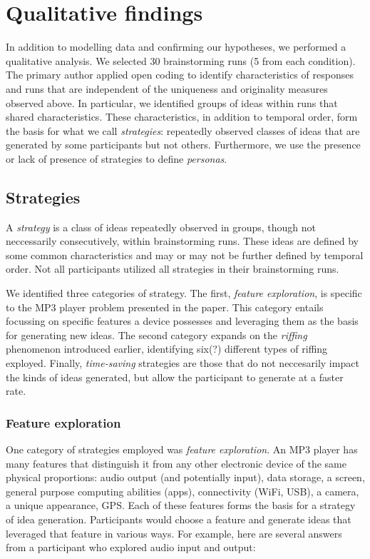 \section{Qualitative findings}

In addition to modelling data and confirming our hypotheses, we performed a qualitative analysis.
We selected 30 brainstorming runs (5 from each condition). The primary author applied open coding to identify characteristics of responses and runs that are independent of the uniqueness and originality measures observed above. In particular, we identified groups of ideas within runs that shared characteristics. These characteristics, in addition to temporal order, form the basis for what we call \emph{strategies}: repeatedly observed classes of ideas that are generated by some participants but not others.
Furthermore, we use the presence or lack of presence of strategies to define \emph{personas}.

\subsection{Strategies}

A \emph{strategy} is a class of ideas repeatedly observed in groups, though not neccessarily consecutively, within brainstorming runs. These ideas are defined by some common characteristics and may or may not be further defined by temporal order. Not all participants utilized all strategies in their brainstorming runs.

We identified three categories of strategy. The first, \emph{feature exploration}, is specific to the MP3 player problem presented in the paper. This category entails focussing on specific features a device possesses and leveraging them as the basis for generating new ideas. The second category expands on the \emph{riffing} phenomenon introduced earlier, identifying six(?) different types of riffing exployed. Finally, \emph{time-saving} strategies are those that do not neccesarily impact the kinds of ideas generated, but allow the participant to generate at a faster rate.

\subsubsection{Feature exploration}

One category of strategies employed was \emph{feature exploration}. An MP3 player has many features that distinguish it from any other electronic device of the same physical proportions: audio output (and potentially input), data storage, a screen, general purpose computing abilities (apps), connectivity (WiFi, USB), a camera, a unique appearance, GPS.
Each of these features forms the basis for a strategy of idea generation.
Participants would choose a feature and generate ideas that leveraged that feature in various ways. For example, here are several answers from a participant who explored audio input and output:

